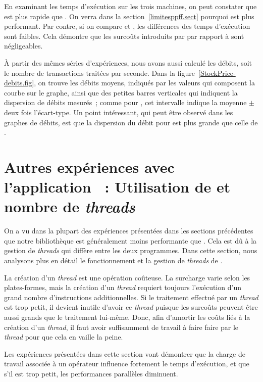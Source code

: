 En examinant les temps d'ex\'ecution sur les trois machines, on peut constater que  est plus rapide que . On verra dans la section~\ref{limitesppff.sect} pourquoi  est plus performant. Par contre, si on compare  et , les diff\'erences des temps d'ex\'ecution sont faibles. Cela d\'emontre que les surco\^uts introduits par  par rapport \`a  sont négligeables.

\`A partir des m\^emes s\'eries d'exp\'eriences, nous avons aussi calcul\'e les d\'ebits, soit le nombre de transactions trait\'ees par seconde. Dans la figure~\ref{StockPrice-debits.fig}, on trouve les d\'ebits moyens, indiqués par les valeurs qui composent la courbe sur le graphe, ainsi que des petites barres verticales qui indiquent la dispersion de débits mesurés~; comme pour , cet intervalle indique la moyenne $\pm$ deux fois l'écart-type. Un point int\'eressant, qui peut \^etre observ\'e dans les graphes de d\'ebits, est que la dispersion du d\'ebit pour  est plus grande que celle de . 

\section{Autres expériences avec l'application ~: Utilisation de  et nombre de \emph{threads}} 
\label{autres-experiences-wordcount.sect}

On a vu dans la plupart des exp\'eriences présentées dans les sections précédentes que notre biblioth\`eque  est généralement moins performante que . Cela est d\^u \`a la gestion de \emph{threads} qui diff\`ere entre les deux programmes. Dans cette section, nous analysons plus en détail le fonctionnement et la gestion de \emph{threads} de . 

La cr\'eation d'un \emph{thread} est une opération co\^uteuse. La surcharge varie selon les plates-formes, mais la cr\'eation d'un \emph{thread} requiert toujours l'exécution d'un grand nombre d'instructions additionnelles. Si le traitement effectué par un \emph{thread} est trop petit, il devient inutile d'avoir ce \emph{thread} puisque les surcoûts peuvent être aussi grands que le traitement lui-même. Donc, afin d'amortir les co\^uts li\'es \`a la cr\'eation d'un \emph{thread}, il faut avoir suffisamment de travail à faire faire par le \emph{thread} pour que cela en vaille la peine.

Les exp\'eriences présentées dans cette section vont d\'emontrer que la charge de travail associée à un opérateur influence fortement le temps d'ex\'ecution, et que s'il est trop petit, les performances parallèles diminuent.


